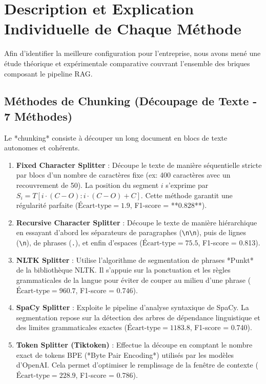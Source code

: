 \documentclass[12pt,a4paper,oneside]{report}
\begin{document}
\section{Description et Explication Individuelle de Chaque Méthode}

Afin d'identifier la meilleure configuration pour l'entreprise, nous avons mené une étude théorique et expérimentale comparative couvrant l'ensemble des briques composant le pipeline RAG.

\subsection{Méthodes de Chunking (Découpage de Texte - 7 Méthodes)}
Le *chunking* consiste à découper un long document en blocs de texte autonomes et cohérents.

\begin{enumerate}
    \item \textbf{Fixed Character Splitter} : Découpe le texte de manière séquentielle stricte par blocs d'un nombre de caractères fixe (ex: 400 caractères avec un recouvrement de 50). La position du segment $i$ s'exprime par $S_i = T[i \cdot (C - O) : i \cdot (C - O) + C]$. Cette méthode garantit une régularité parfaite ($\text{Écart-type} = 1.9$, F1-score = **0.828**).
    \item \textbf{Recursive Character Splitter} : Découpe le texte de manière hiérarchique en essayant d'abord les séparateurs de paragraphes (\texttt{\textbackslash n\textbackslash n}), puis de lignes (\texttt{\textbackslash n}), de phrases (\texttt{.}), et enfin d'espaces ($\text{Écart-type} = 75.5$, F1-score = 0.813).
    \item \textbf{NLTK Splitter} : Utilise l'algorithme de segmentation de phrases *Punkt* de la bibliothèque NLTK. Il s'appuie sur la ponctuation et les règles grammaticales de la langue pour éviter de couper au milieu d'une phrase ($\text{Écart-type} = 960.7$, F1-score = 0.746).
    \item \textbf{SpaCy Splitter} : Exploite le pipeline d'analyse syntaxique de SpaCy. La segmentation repose sur la détection des arbres de dépendance linguistique et des limites grammaticales exactes ($\text{Écart-type} = 1183.8$, F1-score = 0.740).
    \item \textbf{Token Splitter (Tiktoken)} : Effectue la découpe en comptant le nombre exact de tokens BPE (*Byte Pair Encoding*) utilisés par les modèles d'OpenAI. Cela permet d'optimiser le remplissage de la fenêtre de contexte ($\text{Écart-type} = 228.9$, F1-score = 0.786).

\end{enumerate}
\end{document}
